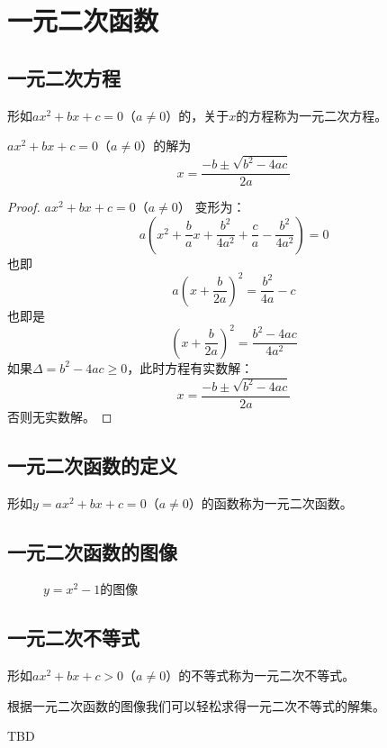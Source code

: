 \section{一元二次函数}
\subsection{一元二次方程}
\begin{definition}[一元二次方程]
    形如$ax^2+bx+c=0$（$a\ne 0$）的，关于$x$的方程称为一元二次方程。
\end{definition}
\begin{theorem}[一元二次方程的解]
    $ax^2+bx+c=0$（$a\ne 0$）的解为
    $$
        x = \frac{-b\pm \sqrt{b^2-4ac}}{2a}
    $$
\end{theorem}
\begin{proof}
    $ax^2+bx+c=0$（$a\ne 0$）
    变形为：
    $$a(x^2+\frac{b}{a}x+\frac{b^2}{4a^2}+\frac{c}{a}-\frac{b^2}{4a^2})=0$$
    也即
    $$a(x+\frac{b}{2a})^2=\frac{b^2}{4a}-c$$
    也即是
    $$(x+\frac{b}{2a})^2=\frac{b^2-4ac}{4a^2}$$
    如果$\Delta =b^2-4ac \geq 0$，此时方程有实数解：
    $$x = \frac{-b\pm \sqrt{b^2-4ac}}{2a}$$
    否则无实数解。
\end{proof}
\subsection{一元二次函数的定义}
\begin{definition}[一元二次函数]
    形如$y=ax^2+bx+c=0$（$a\ne 0$）的函数称为一元二次函数。
\end{definition}
\subsection{一元二次函数的图像}
\begin{figure}[H]
    \centering
    \caption{$y=x^2-1$的图像}
\end{figure}

\subsection{一元二次不等式}
\begin{definition}[一元二次不等式]
    形如$ax^2+bx+c>0$（$a\ne 0$）的不等式称为一元二次不等式。
\end{definition}
根据一元二次函数的图像我们可以轻松求得一元二次不等式的解集。

\begin{problemset}
    \item TBD
\end{problemset}